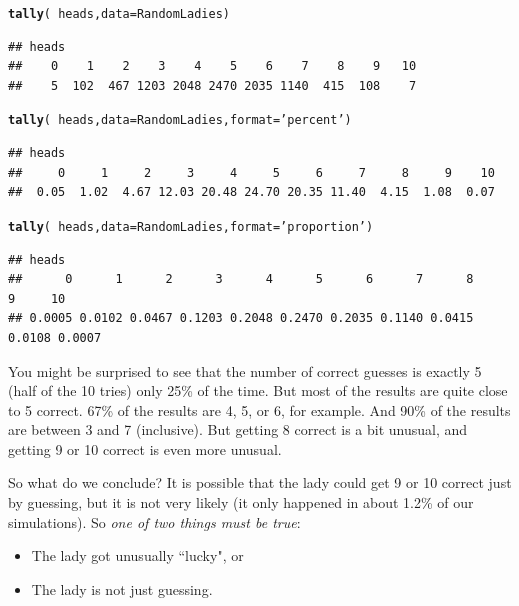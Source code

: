 \documentclass[twoside]{book}\usepackage[]{graphicx}\usepackage[]{xcolor}
\makeatletter
\newcommand{\hlstr}[1]{\textcolor[rgb]{0.192,0.494,0.8}{#1}}%
\newcommand{\hlopt}[1]{\textcolor[rgb]{0,0,0}{#1}}%
\newcommand{\hlstd}[1]{\textcolor[rgb]{0.345,0.345,0.345}{#1}}%
\newcommand{\hlkwc}[1]{\textcolor[rgb]{0.333,0.667,0.333}{#1}}%
\newcommand{\hlkwd}[1]{\textcolor[rgb]{0.737,0.353,0.396}{\textbf{#1}}}%
\newenvironment{kframe}{%
 \def\at@end@of@kframe{}%
 \ifinner\ifhmode%
  \def\at@end@of@kframe{\end{minipage}}%
  \begin{minipage}{\columnwidth}%
 \fi\fi%
 \def\FrameCommand##1{\hskip\@totalleftmargin \hskip-\fboxsep
 \colorbox{shadecolor}{##1}\hskip-\fboxsep
     \hskip-\linewidth \hskip-\@totalleftmargin \hskip\columnwidth}%
 \MakeFramed {\advance\hsize-\width
   \@totalleftmargin\z@ \linewidth\hsize
   \@setminipage}}%
 {\par\unskip\endMakeFramed%
 \at@end@of@kframe}
\newenvironment{knitrout}{}{} %
\newcounter{example}[section]
\makeatother
\begin{document}
\begin{knitrout}
\color{fgcolor}\begin{kframe}
\begin{alltt}
\hlkwd{tally}\hlstd{(} \hlopt{~} \hlstd{heads,} \hlkwc{data} \hlstd{= RandomLadies)}
\end{alltt}
\begin{verbatim}
## heads
##    0    1    2    3    4    5    6    7    8    9   10 
##    5  102  467 1203 2048 2470 2035 1140  415  108    7
\end{verbatim}
\begin{alltt}
\hlkwd{tally}\hlstd{(} \hlopt{~} \hlstd{heads,} \hlkwc{data} \hlstd{= RandomLadies,} \hlkwc{format} \hlstd{=} \hlstr{'percent'}\hlstd{)}
\end{alltt}
\begin{verbatim}
## heads
##     0     1     2     3     4     5     6     7     8     9    10 
##  0.05  1.02  4.67 12.03 20.48 24.70 20.35 11.40  4.15  1.08  0.07
\end{verbatim}
\begin{alltt}
\hlkwd{tally}\hlstd{(} \hlopt{~} \hlstd{heads,} \hlkwc{data} \hlstd{= RandomLadies,} \hlkwc{format} \hlstd{=} \hlstr{'proportion'}\hlstd{)}
\end{alltt}
\begin{verbatim}
## heads
##      0      1      2      3      4      5      6      7      8      9     10 
## 0.0005 0.0102 0.0467 0.1203 0.2048 0.2470 0.2035 0.1140 0.0415 0.0108 0.0007
\end{verbatim}
\end{kframe}
\end{knitrout}


You might be surprised to see that the number of correct guesses
is exactly 5 (half of the 10 tries) only 
25\%
of the time.  But most of the results are quite close to 5 correct.
67\% of the results are 
4, 5, or 6, for example.
And 90\% of the results 
are  between 3 and 7 (inclusive).
But getting 8 correct is a bit unusual, and getting 9 or 10 correct is even 
more unusual.  

So what do we conclude?  It is possible that the lady could get 9 or 10 correct
just by guessing, but it is not very likely (it only happened in about
1.2\% of our simulations). 
So \emph{one of two things must be true}:
\begin{itemize}
\item The lady got unusually ``lucky", or 
\item The lady is not just guessing.
\end{itemize}
\end{document}
